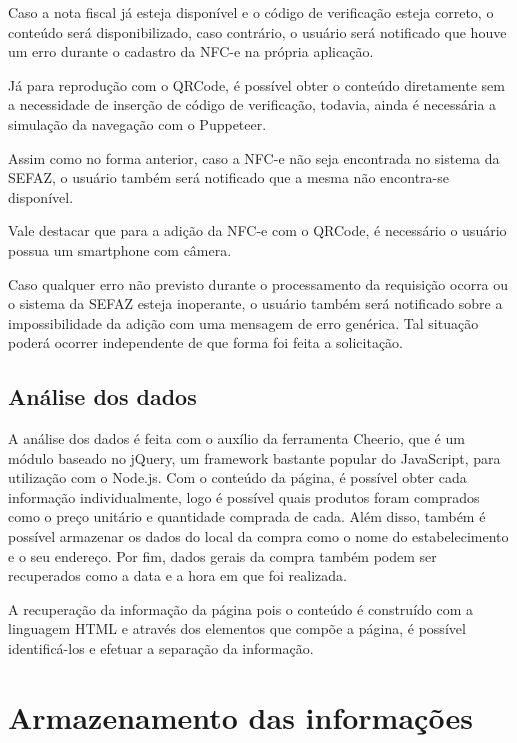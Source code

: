 
Caso a nota fiscal já esteja disponível e o código de verificação esteja correto, o conteúdo será disponibilizado, caso contrário, o usuário será notificado que houve um erro durante o cadastro da NFC-e na própria aplicação.

Já para reprodução com o QRCode, é possível obter o conteúdo diretamente sem a necessidade de inserção de código de verificação, todavia, ainda é necessária a simulação da navegação com o Puppeteer.

Assim como no forma anterior, caso a NFC-e não seja encontrada no sistema da SEFAZ, o usuário também será notificado que a mesma não encontra-se disponível.

Vale destacar que para a adição da NFC-e com o QRCode, é necessário o usuário possua um smartphone com câmera.

Caso qualquer erro não previsto durante o processamento da requisição ocorra ou o sistema da SEFAZ esteja inoperante, o usuário também será notificado sobre a impossibilidade da adição com uma mensagem de erro genérica. Tal situação poderá ocorrer independente de que forma foi feita a solicitação.

\subsection{Análise dos dados}

A análise dos dados é feita com o auxílio da ferramenta Cheerio, que é um módulo baseado no jQuery, um framework bastante popular do JavaScript, para utilização com o Node.js. Com o conteúdo da página, é possível obter cada informação individualmente, logo é possível quais produtos foram comprados como o preço unitário e quantidade comprada de cada. Além disso, também é possível armazenar os dados do local da compra como o nome do estabelecimento e o seu endereço. Por fim, dados gerais da compra também podem ser recuperados como a data e a hora em que foi realizada.

A recuperação da informação da página pois o conteúdo é construído com a linguagem HTML e através dos elementos que compõe a página, é possível identificá-los e efetuar a separação da informação.

\section{Armazenamento das informações}
\label{armazenamentoInfo}

